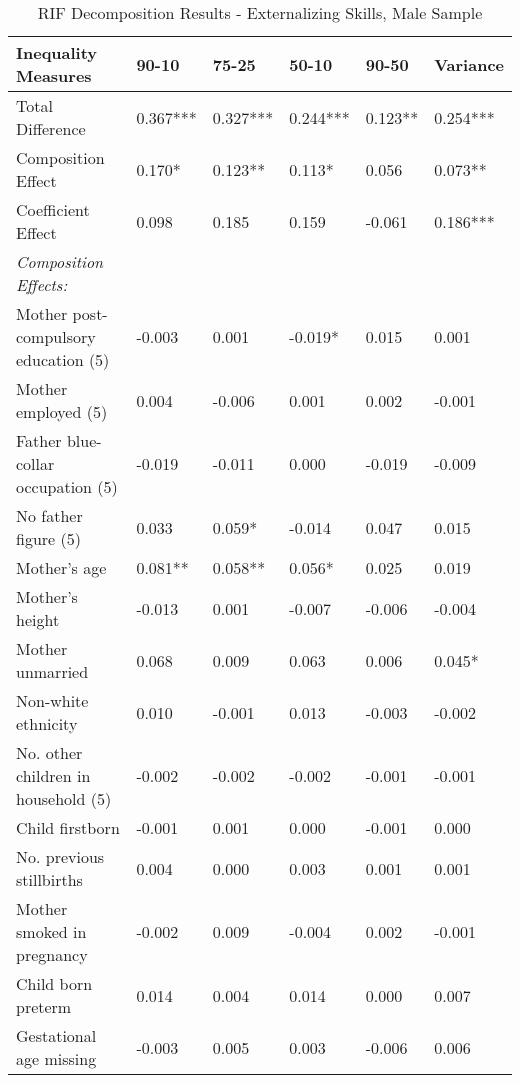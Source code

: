 \begin{table}[htbp]
  \centering
  \caption{RIF Decomposition Results - Externalizing Skills, Male Sample}\label{tab:RIF-EXT-M}
\begingroup\footnotesize
\begin{tabular}{L{.3\textwidth}C{.085\textwidth}C{.085\textwidth}C{.085\textwidth}C{.085\textwidth}C{.085\textwidth}}
     \toprule
      \textbf{Inequality Measures}    & \textbf{90-10} & \textbf{75-25} & \textbf{50-10} & \textbf{90-50} & \textbf{Variance} \\
    \midrule
    Total Difference & 0.367*** & 0.327*** & 0.244*** & 0.123** & 0.254*** \\
    Composition Effect & 0.170* & 0.123** & 0.113* & 0.056 & 0.073** \\
    Coefficient Effect & 0.098 & 0.185 & 0.159 & -0.061 & 0.186*** \\
    \textit{Composition Effects:} &       &       &       &       &  \\
    Mother post-compulsory education (5) & -0.003 & 0.001 & -0.019* & 0.015 & 0.001 \\
    Mother employed (5) & 0.004 & -0.006 & 0.001 & 0.002 & -0.001 \\
    Father blue-collar occupation (5) & -0.019 & -0.011 & 0.000 & -0.019 & -0.009 \\
    No father figure (5) & 0.033 & 0.059* & -0.014 & 0.047 & 0.015 \\
    Mother's age & 0.081** & 0.058** & 0.056* & 0.025 & 0.019 \\
    Mother's height & -0.013 & 0.001 & -0.007 & -0.006 & -0.004 \\
    Mother unmarried & 0.068 & 0.009 & 0.063 & 0.006 & 0.045* \\
    Non-white ethnicity & 0.010 & -0.001 & 0.013 & -0.003 & -0.002 \\
    No. other children in household (5) & -0.002 & -0.002 & -0.002 & -0.001 & -0.001 \\
    Child firstborn & -0.001 & 0.001 & 0.000 & -0.001 & 0.000 \\
    No. previous stillbirths & 0.004 & 0.000 & 0.003 & 0.001 & 0.001 \\
    Mother smoked in pregnancy & -0.002 & 0.009 & -0.004 & 0.002 & -0.001 \\
    Child born preterm & 0.014 & 0.004 & 0.014 & 0.000 & 0.007 \\
    Gestational age missing & -0.003 & 0.005 & 0.003 & -0.006 & 0.006 \\

\end{tabular}
\end{table}
